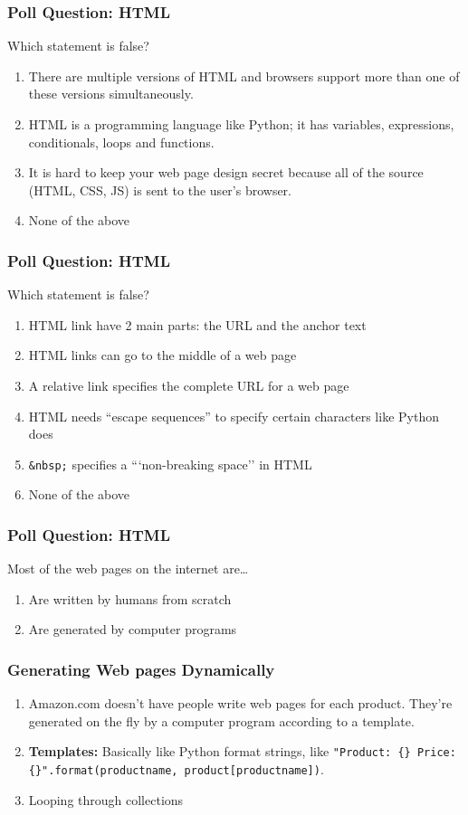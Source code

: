 \documentclass{beamer}
\begin{document}
%
%
\begin{frame}[fragile]
  \frametitle{Poll Question: HTML}
  Which statement is false?
  \begin{enumerate}[A]
    \item There are multiple versions of HTML and browsers support more than one of these versions simultaneously.
    \item HTML is a programming language like Python; it has variables, expressions, conditionals, loops and functions.
    \item It is hard to keep your web page design secret because all of the source (HTML, CSS, JS) is sent to the user's browser.
    \item None of the above
  \end{enumerate}
\end{frame}

%
%
\begin{frame}[fragile]
  \frametitle{Poll Question: HTML}
  Which statement is false?
  \begin{enumerate}[A]
    \item HTML link have 2 main parts: the URL and the anchor text
    \item HTML links can go to the middle of a web page
    \item A relative link specifies the complete URL for a web page
    \item HTML needs ``escape sequences'' to specify certain characters like Python does
    \item \lstinline|&nbsp;| specifies a ```non-breaking space'' in HTML
    \item None of the above
  \end{enumerate}
\end{frame}

%
%
\begin{frame}[fragile]
  \frametitle{Poll Question: HTML}
  Most of the web pages on the internet are\ldots
  \begin{enumerate}[A]
    \item Are written by humans from scratch
    \item Are generated by computer programs
  \end{enumerate}
\end{frame}

%
%
\begin{frame}[fragile]
  \frametitle{Generating Web pages Dynamically}
  \begin{enumerate}[A]
    \item Amazon.com doesn't have people write web pages for each product. They're generated on the fly by a computer program according to a template.
    \item \textbf{Templates: } Basically like Python format strings, like \lstinline|"Product: {} Price: {}".format(productname, product[productname])|.
    \item Looping through collections
  \end{enumerate}
\end{frame}
\end{document}
